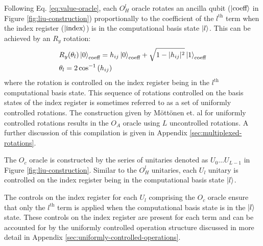 Following Eq. \ref{eq:value-oracle}, each $O_H^l$ oracle rotates an ancilla qubit ($\ket{\text{coeff}}$ in Figure \ref{fig:liu-construction}) proportionally to the coefficient of the $l^\text{th}$ term when the index register ($\ket{\text{index}}$) is in the computational basis state $\ket{l}$.
This can be achieved by an $R_y$ rotation:
\begin{equation}
    \begin{split}
        & R_y (\theta_l) \ket{0}_\text{coeff} = h_{ij} \ket{0}_\text{coeff} + \sqrt{1 - |h_{ij}|^2} \ket{1}_\text{coeff} \\
        & \theta_l = 2 \cos^{-1}{(h_{ij})}
    \end{split}
\end{equation}
where the rotation is controlled on the index register being in the $l^\text{th}$ computational basis state.
This sequence of rotations controlled on the basis states of the index register is sometimes referred to as a set of uniformly controlled rotations.
The construction given by Möttönen et. al \cite{mottonen2004transformation} for uniformly controlled rotations results in the $O_A$ oracle using $L$ uncontrolled rotations.
A further discussion of this compilation is given in Appendix \ref{sec:multiplexed-rotations}.

The $O_c$ oracle is constructed by the series of unitaries denoted as $U_0 \dots U_{L - 1}$ in Figure \ref{fig:liu-construction}.
Similar to the $O_H^l$ unitaries, each $U_l$ unitary is controlled on the index register being in the computational basis state $\ket{l}$.

The controls on the index register for each $U_l$ comprising the $O_c$ oracle ensure that only the $l^\text{th}$ term is applied when the computational basis state is in the $\ket{l}$ state.
These controls on the index register are present for each term and can be accounted for by the uniformly controlled operation structure discussed in more detail in Appendix \ref{sec:uniformly-controlled-operations}.

